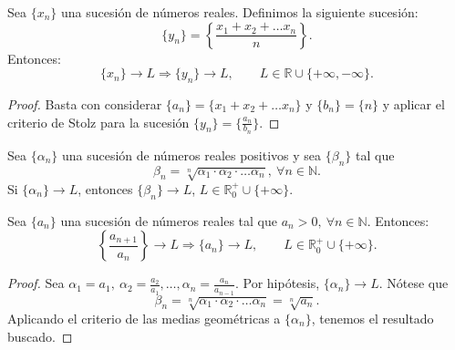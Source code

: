 \begin{coro}
    Sea $\{x_n\}$ una sucesión de números reales. Definimos la siguiente sucesión:
    \begin{equation*}
        \{y_n\} = \left\{\frac{x_1 + x_2 + \dots x_n}{n}\right\}.
    \end{equation*}
    Entonces:
    \begin{equation*}
        \{x_n\} \longrightarrow L \Longrightarrow \{y_n\} \longrightarrow L, \qquad L \in \mathbb{R} \cup \{+ \infty, -\infty\}.
    \end{equation*}
\end{coro}
\begin{proof}
    Basta con considerar $\{a_n\} = \{x_1 + x_2 + \dots x_n\}$ y $\{b_n\} = \{n\}$ y aplicar el criterio de Stolz para la sucesión $\{y_n\} = \{\frac{a_n}{b_n}\}$.
\end{proof}

\begin{coro}
    Sea $\{\alpha_n\}$ una sucesión de números reales positivos y sea $\{\beta_n\}$ tal que
    \begin{equation*}
        \beta_n = \sqrt[n]{\alpha_1 \cdot \alpha_2 \cdot \dots \alpha_n}, ~ \forall n \in \mathbb{N}.
    \end{equation*}
    Si $\{\alpha_n\} \longrightarrow L$, entonces $\{\beta_n\} \longrightarrow L$, $L \in \mathbb{R}^+_0 \cup \{+ \infty\}$.
\end{coro}

\begin{teo}
    Sea $\{a_n\}$ una sucesión de números reales tal que $a_n > 0, ~ \forall n \in \mathbb{N}$. Entonces:
    \begin{equation*}
        \left\{\frac{a_{n+1}}{a_n}\right\} \longrightarrow L \Longrightarrow \{a_n\} \longrightarrow L, \qquad L \in \mathbb{R}^+_0 \cup \{+ \infty\}.
    \end{equation*}
\end{teo}
\begin{proof}
    Sea $\alpha_1 = a_1, ~\alpha_2 = \frac{a_2}{a_1}, \dots, \alpha_n = \frac{a_{n}}{a_{n-1}}$. Por hipótesis, $\{\alpha_n\} \longrightarrow L$.
    Nótese que
    \begin{equation*}
        \beta_n = \sqrt[n]{\alpha_1 \cdot \alpha_2 \cdot \dots \alpha_n} = \sqrt[n]{a_n}.
    \end{equation*}
    Aplicando el criterio de las medias geométricas a $\{\alpha_n\}$, tenemos el resultado buscado.
\end{proof}

